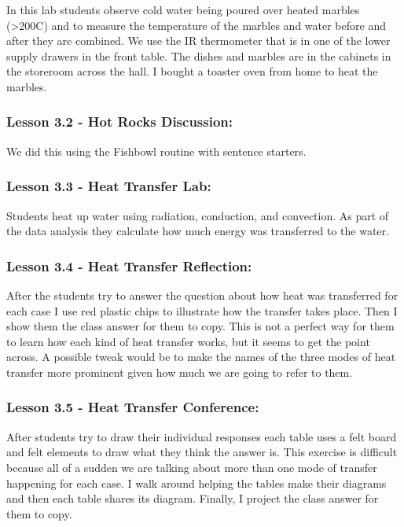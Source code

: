 \documentclass[11pt]{article}
\begin{document}
In this lab students observe cold water being poured
over heated marbles (>200C) and to measure the temperature of the marbles and water
before and after they are combined. We use the IR thermometer that is in one of the
lower supply drawers in the front table. The dishes and marbles are in the cabinets in the
storeroom across the hall. I bought a toaster oven from home to heat the marbles.


\subsubsection{Lesson 3.2 - Hot Rocks Discussion:}
\label{sec:orgfdf4ca4}

We did this using the Fishbowl routine with sentence starters.


\subsubsection{Lesson 3.3 - Heat Transfer Lab:}
\label{sec:orgb67c5ef}

Students heat up water using radiation, conduction, and
convection. As part of the data analysis they calculate how much energy was transferred
to the water.


\subsubsection{Lesson 3.4 - Heat Transfer Reflection:}
\label{sec:org281ee4b}

After the students try to answer the question about how heat was transferred for each case I use red plastic chips to illustrate how the
transfer takes place. Then I show them the class answer for them to copy. This is not a
perfect way for them to learn how each kind of heat transfer works, but it seems to get
the point across. A possible tweak would be to make the names of the three modes of
heat transfer more prominent given how much we are going to refer to them.


\subsubsection{Lesson 3.5 - Heat Transfer Conference:}
\label{sec:orga9ff551}

After students try to draw their individual responses each table uses a felt board and felt elements to draw what they think the
answer is. This exercise is difficult because all of a sudden we are talking about more
than one mode of transfer happening for each case. I walk around helping the tables
make their diagrams and then each table shares its diagram. Finally, I project the class
answer for them to copy.
\end{document}

